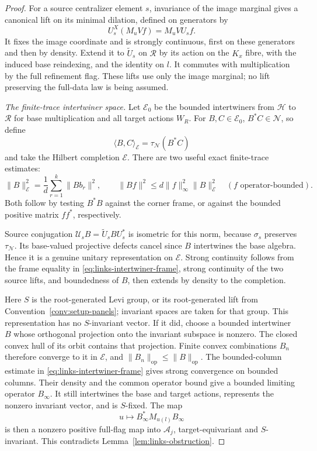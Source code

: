 \begin{proof}
For a source centralizer element \(s\), invariance of the image
marginal gives a canonical lift on its minimal dilation, defined
on generators by
\[
 U_s^X(M_uVf)=M_uVU_sf.
\]
It fixes the image coordinate and is strongly continuous, first
on these generators and then by density. Extend it to
\(\widetilde U_s\) on \(\mathcal R\) by its action on the
\(K_x\) fibre, with the induced base reindexing, and the identity
on \(l\). It commutes with multiplication by the full
refinement flag. These lifts use only the image marginal; no
lift preserving the full-data law is being assumed.

\emph{The finite-trace intertwiner space.}
Let \(\mathscr E_0\) be the bounded intertwiners from
\(\mathcal H\) to \(\mathcal R\) for base multiplication and
all target actions \(W_R\). For \(B,C\in\mathscr E_0\),
\(B^*C\in\mathcal N\), so define
\[
 \langle B,C\rangle_{\mathscr E}
       =\tau_{\mathcal N}(B^*C)
\]
and take the Hilbert completion \(\mathscr E\). There are two
useful exact finite-trace estimates:
\begin{equation}
 \|B\|_{\mathscr E}^2
       =\frac1d\sum_{r=1}^k\|Bb_r\|^2,
 \qquad
 \|Bf\|^2\leq d\|f\|_\infty^2\|B\|_{\mathscr E}^2
 \quad(f\text{ operator-bounded}).
 \label{eq:links-intertwiner-frame}
\end{equation}
Both follow by testing \(B^*B\) against the corner frame, or
against the bounded positive matrix \(ff^*\), respectively.

Source conjugation
\(\mathscr U_sB=\widetilde U_sBU_s^*\) is isometric for this
norm, because \(\sigma_s\) preserves
\(\tau_{\mathcal N}\). Its base-valued projective defects
cancel since \(B\) intertwines the base algebra. Hence it is a
genuine unitary representation on \(\mathscr E\).
Strong continuity follows from the frame equality in
\eqref{eq:links-intertwiner-frame}, strong continuity of the two
source lifts, and boundedness of \(B\), then extends by density
to the completion.

Here \(S\) is the root-generated Levi group, or its root-generated
lift from Convention~\ref{conv:setup-panels}; invariant spaces are
taken for that group.  This representation has no \(S\)-invariant
vector. If it did,
choose a bounded intertwiner \(B\) whose orthogonal projection
onto the invariant subspace is nonzero. The closed convex hull
of its orbit contains that projection. Finite convex combinations
\(B_n\) therefore converge to it in \(\mathscr E\), and
\(\|B_n\|_{\mathrm{op}}\leq\|B\|_{\mathrm{op}}\).
The bounded-column estimate in
\eqref{eq:links-intertwiner-frame} gives strong convergence on
bounded columns. Their density and the common operator bound
give a bounded limiting operator \(B_\infty\). It still
intertwines the base and target actions, represents the nonzero
invariant vector, and is \(S\)-fixed. The map
\[
 u\longmapsto B_\infty^*M_{u(l)}B_\infty
\]
is then a nonzero positive full-flag map into \(\mathcal A_j\),
target-equivariant and \(S\)-invariant. This contradicts
Lemma~\ref{lem:links-obstruction}.


\end{proof}
